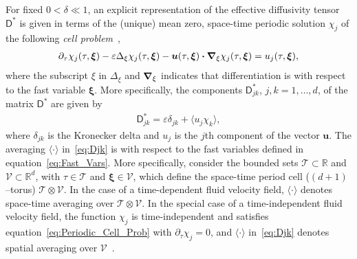 \documentclass[leqno,onefignum,onetabnum]{siamltex1213}
\newcommand{\Tc}{\mathcal{T}}
\newcommand{\Vc}{\mathcal{V}}
\newcommand{\Dm}{\mathsf{D}}
\newcommand\bnabla{\mbox{\boldmath${\nabla}$}}
\providecommand\bcdot{\boldsymbol{\cdot}}
\newcommand{\vecu}{\boldsymbol{u}}
\newcommand{\vecxi}{\boldsymbol{\xi}}
\begin{document}
For fixed $0<\delta\ll1$, an explicit representation of the effective
diffusivity tensor $\Dm^*$ is given in terms of the (unique) mean
zero, space-time periodic solution $\chi_j$ of the following \emph{cell
  problem}~\cite{Majda:Kramer:1999:book},        
%
\begin{align}\label{eq:Periodic_Cell_Prob}
  \partial_\tau\chi_j(\tau,\vecxi)
  -\varepsilon\Delta_\xi\chi_j(\tau,\vecxi)
  -\vecu(\tau,\vecxi) \bcdot\bnabla_\xi \chi_j(\tau,\vecxi)
  =u_j(\tau,\vecxi),
\end{align}
%
where the subscript $\xi$ in $\Delta_\xi$ and $\bnabla_\xi$ indicates that
differentiation is with respect to the fast variable
$\vecxi$. More specifically, the components $\Dm^*_{jk}$, $j,k=1,\ldots,d$,
of the matrix $\Dm^*$ are given
by~\cite{McLaughlin:SIAM_JAM:780,Fannjiang:1994:SIAM_JAM:333,Majda:Kramer:1999:book}          
%
\begin{align}\label{eq:Djk}
  \Dm^*_{jk}=\varepsilon\delta_{jk}+\langle u_j\chi_k\rangle,
\end{align}
%
where $\delta_{jk}$ is the Kronecker delta and $u_j$ is the $j$th component
of the vector $\vecu$. The averaging $\langle\cdot\rangle$ in~\eqref{eq:Djk} is with
respect to the fast variables defined in
equation~\eqref{eq:Fast_Vars}. More specifically, consider the bounded
sets  $\Tc\subset\mathbb{R}$ and $\Vc\subset\mathbb{R}^d$, with $\tau\in\Tc$ and
$\vecxi\in\Vc$, which define the space-time period cell ($(d+1)$--torus)
$\Tc\otimes\Vc$. In the case of a time-dependent fluid velocity field, $\langle\cdot\rangle$
denotes space-time averaging over $\Tc\otimes\Vc$. In the special case of a
time-independent fluid velocity field, the function $\chi_j$ is
time-independent and satisfies equation~\eqref{eq:Periodic_Cell_Prob}
with $\partial_\tau\chi_j=0$, and $\langle\cdot\rangle$ in~\eqref{eq:Djk} denotes spatial averaging over
$\Vc$~\cite{Fannjiang:1994:SIAM_JAM:333,Majda:Kramer:1999:book}.    
\end{document}
